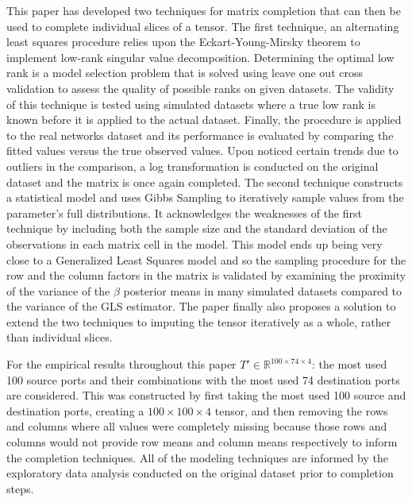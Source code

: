 \documentclass[12pt,twoside]{dukestatscithesis}
\theoremstyle{definition}
\theoremstyle{definition}
\theoremstyle{definition}
\theoremstyle{remark}
\begin{document}
This paper has developed two techniques for matrix completion that can
then be used to complete individual slices of a tensor. The first
technique, an alternating least squares procedure relies upon the
Eckart-Young-Mirsky theorem to implement low-rank singular value
decomposition. Determining the optimal low rank is a model selection
problem that is solved using leave one out cross validation to assess
the quality of possible ranks on given datasets. The validity of this
technique is tested using simulated datasets where a true low rank is
known before it is applied to the actual dataset. Finally, the procedure
is applied to the real networks dataset and its performance is evaluated
by comparing the fitted values versus the true observed values. Upon
noticed certain trends due to outliers in the comparison, a log
transformation is conducted on the original dataset and the matrix is
once again completed. The second technique constructs a statistical
model and uses Gibbs Sampling to iteratively sample values from the
parameter's full distributions. It acknowledges the weaknesses of the
first technique by including both the sample size and the standard
deviation of the observations in each matrix cell in the model. This
model ends up being very close to a Generalized Least Squares model and
so the sampling procedure for the row and the column factors in the
matrix is validated by examining the proximity of the variance of the
\(\beta\) posterior means in many simulated datasets compared to the
variance of the GLS estimator. The paper finally also proposes a
solution to extend the two techniques to imputing the tensor iteratively
as a whole, rather than individual slices.

For the empirical results throughout this paper
\(T' \in \mathbb{R}^{100 \times 74 \times 4}\): the most used 100 source
ports and their combinations with the most used 74 destination ports are
considered. This was constructed by first taking the most used 100
source and destination ports, creating a \(100 \times 100 \times 4\)
tensor, and then removing the rows and columns where all values were
completely missing because those rows and columns would not provide row
means and column means respectively to inform the completion techniques.
All of the modeling techniques are informed by the exploratory data
analysis conducted on the original dataset prior to completion steps.
\end{document}
